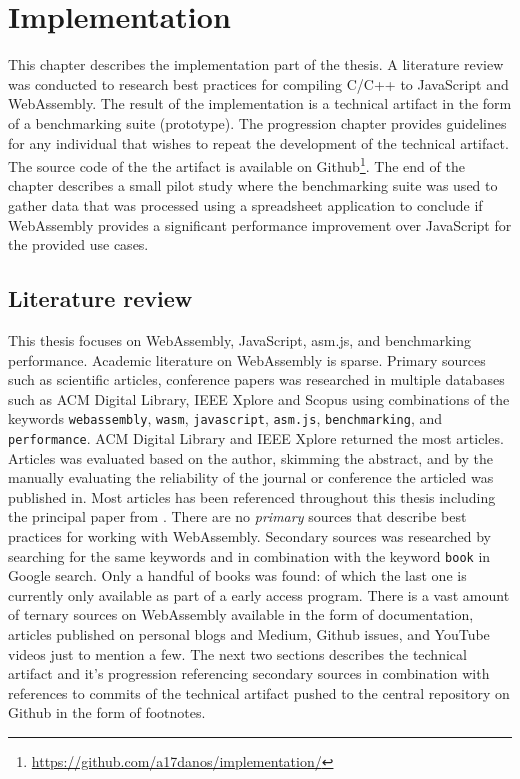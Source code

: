 \section{Implementation}
\label{implementation}

This chapter describes the implementation part of the thesis. A literature review was conducted to research best practices for compiling C/C++ to JavaScript and WebAssembly.
The result of the implementation is a technical artifact in the form of a benchmarking suite (prototype). The progression chapter provides guidelines for any individual that wishes to repeat the development of the technical artifact. The source code of the the artifact is available on Github\footnote{\url{https://github.com/a17danos/implementation/}}. The end of the chapter describes a small pilot study where the benchmarking suite was used to gather data that was processed using a spreadsheet application to conclude if WebAssembly provides a significant performance improvement over JavaScript for the provided use cases.

\subsection{Literature review}

This thesis focuses on WebAssembly, JavaScript, asm.js, and benchmarking performance. Academic literature on WebAssembly is sparse. Primary sources such as scientific articles, conference papers was researched in multiple databases such as ACM Digital Library, IEEE Xplore and Scopus using combinations of the keywords \texttt{webassembly}, \texttt{wasm}, \texttt{javascript}, \texttt{asm.js}, \texttt{benchmarking}, and \texttt{performance}. ACM Digital Library and IEEE Xplore returned the most articles. Articles was evaluated based on the author, skimming the abstract, and by the manually evaluating the reliability of the journal or conference the articled was published in. Most articles has been referenced throughout this thesis including the principal paper from \textcite{HaasRossbergSchuffTitzerHolmanGohmanWagnerZakaiBastien2017}. There are no \emph{primary} sources that describe best practices for working with WebAssembly. Secondary sources was researched by searching for the same keywords and in combination with the keyword \texttt{book} in Google search. Only a handful of books was found: \textcite{Barker2012,Rourke2018,Gallant2019} of which the last one is currently only available as part of a early access program. There is a vast amount of ternary sources on WebAssembly available in the form of documentation, articles published on personal blogs and Medium, Github issues, and YouTube videos just to mention a few. The next two sections describes the technical artifact and it's progression referencing secondary sources in combination with references to commits of the technical artifact pushed to the central repository on Github in the form of footnotes.

